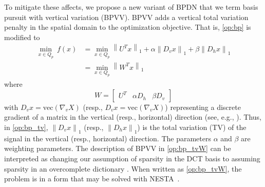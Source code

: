 \documentclass[twocolumn,oneside]{IEEEtran/IEEEtran}
\begin{document}
To mitigate these affects, we propose a new variant of BPDN that we term basis pursuit with
vertical variation (BPVV). BPVV adds a vertical total variation penalty in the spatial domain to the
optimization objective. That is, \eqref{op:bp} is modified to
\begin{align}
  \min_{x\in Q_p}~f(x) &= \min_{x\in Q_p} \left\|U^Tx\right\|_1
                         + \alpha\left\|D_vx\right\|_1
                         + \beta\left\|D_hx\right\|_1 \label{op:bp_tv}\\
                       &=\min_{x\in Q_p} \left\|W^Tx\right\|_1 \label{op:bp_tvW}
\end{align}
where
\begin{equation*}
W = \begin{bmatrix}U^T&\alpha D_h&\beta D_v \end{bmatrix}
\end{equation*}
with ${D_v x=\text{vec}(\nabla_v X)}$ (resp., ${D_v x=\text{vec}(\nabla_v X)}$) representing a 
discrete gradient of a matrix in the vertical (resp., horizontal) direction (see, e.g., \cite[Section 6.1,]{becker_nesta_2011}). 
Thus, in \eqref{op:bp_tv}, $\left \| D_v x \right \|_1$ (resp., $\left \| D_h x \right \|_1$) is the total variation (TV) of the signal in the vertical (resp., horizontal) direction.
The parameters $\alpha$ and $\beta$ are weighting parameters.
The description of BPVV in \eqref{op:bp_tvW} can be interpreted as changing our assumption of sparsity in the DCT basis to assuming sparsity in an overcomplete dictionary \cite{candes_redundant_2011}.
When written as \eqref{op:bp_tvW}, the problem is in a form that may be solved with NESTA~\cite{becker_nesta_2011}.
\end{document}
